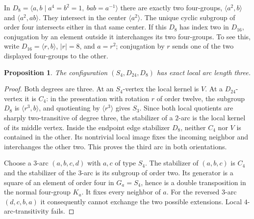 \documentclass[11pt]{article}
\newtheorem{proposition}[lemma]{Proposition}
\begin{document}
In $D_8=\langle a,b\mid a^4=b^2=1,\ b a b=a^{-1}\rangle$
there are exactly two four-groups,
$\langle a^2,b\rangle$ and $\langle a^2,ab\rangle$.
They intersect in the center $\langle a^2\rangle$. The unique cyclic
subgroup of order four intersects either in that same center.
If this $D_8$ has index two in $D_{16}$, conjugation by an element
outside it interchanges its two four-groups. To see this, write
$D_{16}=\langle r,b\rangle$, $|r|=8$, and $a=r^2$; conjugation by
$r$ sends one of the two displayed four-groups to the other.

\begin{proposition}\label{d24}
The configuration $(S_4,D_{24},D_8)$ has exact local arc length three.
\end{proposition}
\begin{proof}
Both degrees are three. At an $S_4$-vertex the local kernel is $V$.
At a $D_{24}$-vertex it is $C_4$: in the presentation with rotation
$r$ of order twelve, the subgroup $D_8$ is $\langle r^3,b\rangle$,
and quotienting by $\langle r^3\rangle$ gives $S_3$.
Since both local quotients are sharply two-transitive of degree three,
the stabilizer of a $2$-arc is the local kernel of its middle vertex.
Inside the endpoint edge stabilizer $D_8$, neither $C_4$ nor $V$ is
contained in the other. Its nontrivial local image fixes the incoming
neighbor and interchanges the other two. This proves the third arc in
both orientations.

Choose a $3$-arc $(a,b,c,d)$ with $a,c$ of type $S_4$.
The stabilizer of $(a,b,c)$ is $C_4$ and the stabilizer of the $3$-arc
is its subgroup of order two. Its generator is a square of an element
of order four in $G_a=S_4$, hence is a double transposition in the
normal four-group $K_a$. It fixes every neighbor of $a$. For the reversed
$3$-arc $(d,c,b,a)$ it consequently cannot exchange the two possible
extensions. Local $4$-arc-transitivity fails.
\end{proof}
\end{document}
